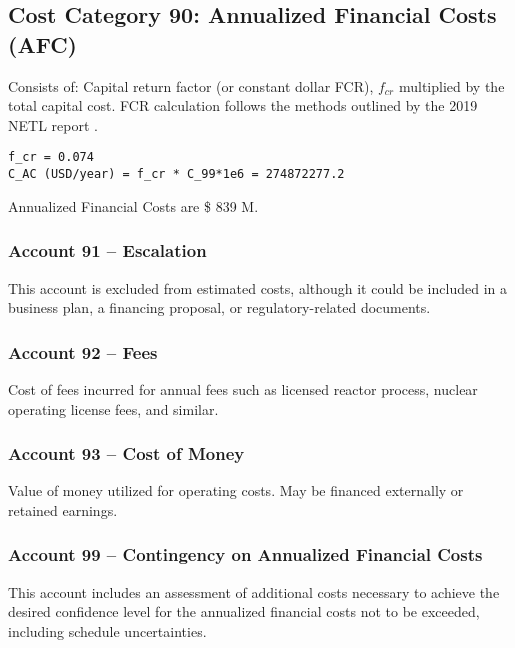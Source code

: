 \subsection{Cost Category 90: Annualized Financial Costs (AFC)}

Consists of: Capital return factor (or constant dollar FCR), $f_{cr}$ multiplied by the total capital cost. FCR calculation follows the methods outlined by the 2019 NETL report \cite{NETL2019a}.

\begin{verbatim} 
f_cr = 0.074 
C_AC (USD/year) = f_cr * C_99*1e6 = 274872277.2
\end{verbatim} 

Annualized Financial Costs are \$ 839 M.

\subsubsection*{Account 91 – Escalation}
This account is excluded from estimated costs, although it could be included in a business plan, a financing proposal, or regulatory-related documents.

\subsubsection*{Account 92 – Fees}
Cost of fees incurred for annual fees such as licensed reactor process, nuclear operating license fees, and similar.

\subsubsection*{Account 93 – Cost of Money}
Value of money utilized for operating costs. May be financed externally or retained earnings.

\subsubsection*{Account 99 – Contingency on Annualized Financial Costs}
This account includes an assessment of additional costs necessary to achieve the desired confidence level for the annualized financial costs not to be exceeded, including schedule uncertainties.
